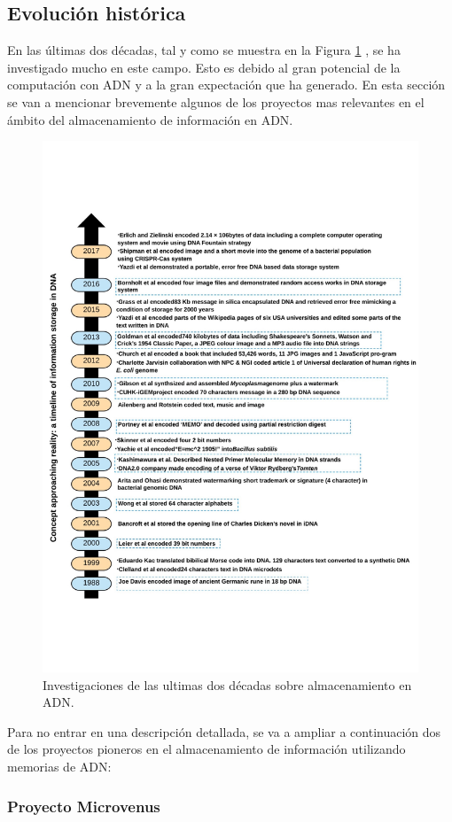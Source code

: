 \documentclass[a4paper,11pt]{article}
\begin{document}
\subsection{Evolución histórica}
En las últimas dos décadas, tal y como se muestra en la Figura \ref{fig:ordendescubrimientos} \citep{DeSilva2016}, se ha investigado mucho en este campo. Esto es debido al gran potencial de la computación con ADN y a la gran expectación que ha generado. En esta sección se van a mencionar brevemente algunos de los proyectos mas relevantes en el ámbito del almacenamiento de información en ADN.

\begin{figure}[h!]
\begin{center}
\includegraphics[width=0.75\linewidth]{orden-descubrimientos.pdf}
\caption{Investigaciones de las ultimas dos décadas sobre almacenamiento en ADN.}
\label{fig:ordendescubrimientos}
\end{center}
\end{figure}

Para no entrar en una descripción detallada, se va a ampliar a continuación dos de los proyectos pioneros en el almacenamiento de información utilizando memorias de ADN:

\subsubsection{Proyecto Microvenus}
\end{document}

